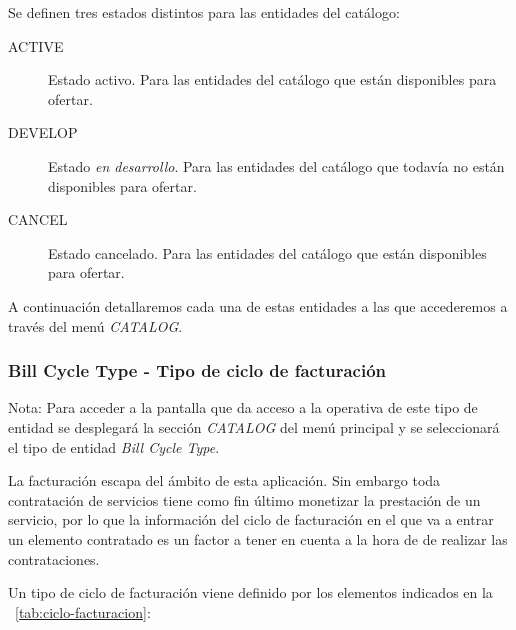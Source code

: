 Se definen tres estados distintos para las entidades del catálogo:
\begin{description}
\item[ACTIVE] Estado activo. Para las entidades del catálogo que están disponibles para ofertar.
\item[DEVELOP] Estado \textit{en desarrollo}. Para las entidades del catálogo que todavía no están disponibles para ofertar.
\item[CANCEL] Estado cancelado. Para las entidades del catálogo que están disponibles para ofertar.
\end{description}



A continuación detallaremos cada una de estas entidades a las que accederemos a través del menú \emph{CATALOG}.

\subsubsection{Bill Cycle Type - Tipo de ciclo de facturación}
\label{sub:billcycle}

Nota: Para acceder a la pantalla que da acceso a la operativa de este tipo de entidad se desplegará la sección \emph{CATALOG} del menú principal y se seleccionará el tipo de entidad \emph{Bill Cycle Type}.

La facturación escapa del ámbito de esta aplicación. Sin embargo toda contratación de servicios tiene como fin último monetizar la prestación de un servicio, por lo que la información del ciclo de facturación en el que va a entrar un elemento contratado es un factor a tener en cuenta a la hora de de realizar las contrataciones.

Un tipo de ciclo de facturación viene definido por los elementos indicados en la \tablename~\ref{tab:ciclo-facturacion}:



